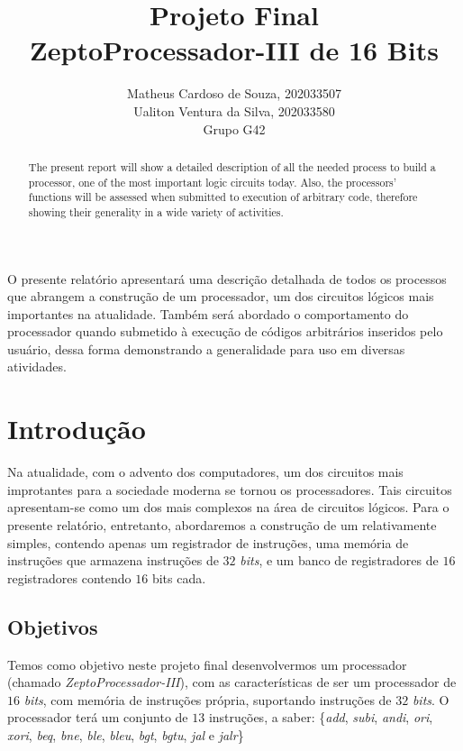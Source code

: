 \documentclass[12pt]{article}
\title{Projeto Final\\
ZeptoProcessador-III de 16 Bits}
\author{Matheus Cardoso de Souza, 202033507\\
        Ualiton Ventura da Silva, 202033580\\
        Grupo G42
}
\begin{document}
\maketitle

 \begin{abstract}
   The present report will show a detailed description of all the needed process
   to build a processor, one of the most important logic circuits today. Also,
   the processors' functions will be assessed when submitted to execution of
   arbitrary code, therefore showing their generality in a wide variety of
   activities.
 \end{abstract}

 \begin{resumo}
   O presente relatório apresentará uma descrição detalhada de todos os
   processos que abrangem a construção de um processador, um dos circuitos
   lógicos mais importantes na atualidade. Também será abordado o comportamento
   do processador quando submetido à execução de códigos arbitrários inseridos
   pelo usuário, dessa forma demonstrando a generalidade para uso em diversas
   atividades.
 \end{resumo}


\section{Introdução}\label{sec:Introducao}

Na atualidade, com o advento dos computadores, um dos circuitos mais improtantes
para a sociedade moderna se tornou os processadores. Tais circuitos
apresentam-se como um dos mais complexos na área de circuitos lógicos. Para o
presente relatório, entretanto, abordaremos a construção de um relativamente
simples, contendo apenas um registrador de instruções, uma memória de instruções
que armazena instruções de $32$ \emph{bits}, e um banco de registradores de $16$
registradores contendo $16$ bits cada.

\subsection{Objetivos}\label{sec:Objetivos}

Temos como objetivo neste projeto final desenvolvermos um processador (chamado
\emph{ZeptoProcessador-III}), com as características de ser um processador de
$16$ \emph{bits}, com memória de instruções própria, suportando instruções de
$32$ \emph{bits}. O processador terá um conjunto de $13$ instruções, a saber:
\{\emph{add}, \emph{subi}, \emph{andi}, \emph{ori}, \emph{xori}, \emph{beq},
\emph{bne}, \emph{ble}, \emph{bleu}, \emph{bgt}, \emph{bgtu}, \emph{jal} e
\emph{jalr}\}
\end{document}
